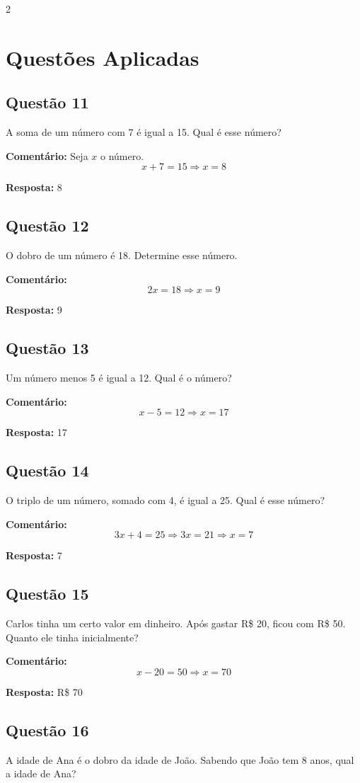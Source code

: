 \documentclass[11pt]{article}
\begin{document}
\begin{multicols}{2}
\section*{Questões Aplicadas}

\subsection*{Questão 11}
A soma de um número com 7 é igual a 15. Qual é esse número?

\textbf{Comentário:}  
Seja $x$ o número.
\[
x + 7 = 15
\Rightarrow x = 8
\]

\textbf{Resposta:} 8

\subsection*{Questão 12}
O dobro de um número é 18. Determine esse número.

\textbf{Comentário:}
\[
2x = 18
\Rightarrow x = 9
\]

\textbf{Resposta:} 9

\subsection*{Questão 13}
Um número menos 5 é igual a 12. Qual é o número?

\textbf{Comentário:}
\[
x - 5 = 12
\Rightarrow x = 17
\]

\textbf{Resposta:} 17

\subsection*{Questão 14}
O triplo de um número, somado com 4, é igual a 25. Qual é esse número?

\textbf{Comentário:}
\[
3x + 4 = 25
\Rightarrow 3x = 21
\Rightarrow x = 7
\]

\textbf{Resposta:} 7

\subsection*{Questão 15}
Carlos tinha um certo valor em dinheiro. Após gastar R\$ 20, ficou com R\$ 50. Quanto ele tinha inicialmente?

\textbf{Comentário:}
\[
x - 20 = 50
\Rightarrow x = 70
\]

\textbf{Resposta:} R\$ 70

\subsection*{Questão 16}
A idade de Ana é o dobro da idade de João. Sabendo que João tem 8 anos, qual a idade de Ana?


\end{multicols}
\end{document}
